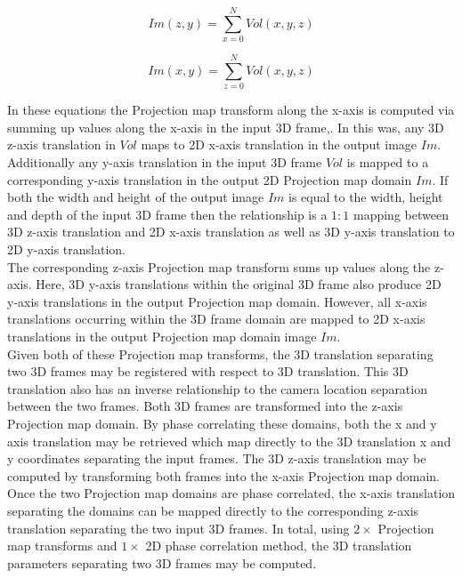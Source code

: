 \begin{equation} \label{eqn:xPMT}
Im(z,y) = \sum_{x=0}^{N}{Vol(x,y,z)}
\end{equation}

\begin{equation} \label{eqn:zPMT}
Im(x,y) = \sum_{z=0}^{N}{Vol(x,y,z)}
\end{equation}

In these equations the Projection map transform along the x-axis is computed via summing up values along the x-axis in the input 3D frame,. In this was, any 3D z-axis translation in $Vol$ maps to 2D x-axis translation in the output image $Im$. Additionally any y-axis translation in the input 3D frame $Vol$ is mapped to a corresponding y-axis translation in the output 2D Projection map domain $Im$. If both the width and height of the output image $Im$ is equal to the width, height and depth of the input 3D frame then the relationship is a $1:1$ mapping between 3D z-axis translation and 2D x-axis translation as well as 3D y-axis translation to 2D y-axis translation. \\

The corresponding z-axis Projection map transform sums up values along the z-axis. Here, 3D y-axis translations within the original 3D frame also produce 2D y-axis translations in the output Projection map domain. However, all x-axis translations occurring within the 3D frame domain are mapped to 2D x-axis translations in the output Projection map domain image $Im$. \\

Given both of these Projection map transforms, the 3D translation separating two 3D frames may be registered with respect to 3D translation. This 3D translation also has an inverse relationship to the camera location separation between the two frames. Both 3D frames are transformed into the z-axis Projection map domain. By phase correlating these domains, both the x and y axis translation may be retrieved which map directly to the 3D translation x and y coordinates separating the input frames. The 3D z-axis translation may be computed by transforming both frames into the x-axis Projection map domain. Once the two Projection map domains are phase correlated, the x-axis translation separating the domains can be mapped directly to the corresponding z-axis translation separating the two input 3D frames. In total, using $2 \times$ Projection map transforms and $1 \times$ 2D phase correlation method, the 3D translation parameters separating two 3D frames may be computed. \\

